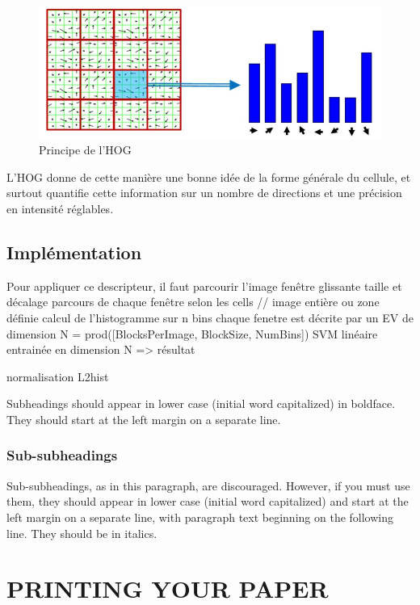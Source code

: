 \documentclass{article}
\begin{document}
	\begin{figure}[hh]
		\begin{center}			
			\includegraphics[scale=0.3]{Img/HOGtheory}
		\end{center}
		\caption{Principe de l'HOG}
	\end{figure}

	L'HOG donne de cette manière une bonne idée de la forme générale du cellule, et surtout quantifie cette information sur un nombre de directions et une précision en intensité réglables.
	
	\subsection{Implémentation}
	Pour appliquer ce descripteur, il faut parcourir l'image 
	fenêtre glissante taille et décalage
	parcours de chaque fenêtre selon les cells // image entière ou zone définie
	calcul de l'histogramme sur n bins
	chaque fenetre est décrite par un EV de dimension N = prod([BlocksPerImage, BlockSize, NumBins])
	SVM linéaire entrainée en dimension N
	=> résultat
	
	normalisation L2hist
\label{ssec:subhead}

Subheadings should appear in lower case (initial word capitalized) in
boldface.  They should start at the left margin on a separate line.
 
\subsubsection{Sub-subheadings}
\label{sssec:subsubhead}

Sub-subheadings, as in this paragraph, are discouraged. However, if you
must use them, they should appear in lower case (initial word
capitalized) and start at the left margin on a separate line, with paragraph
text beginning on the following line.  They should be in italics.

\section{PRINTING YOUR PAPER}
\label{sec:print}
\end{document}
